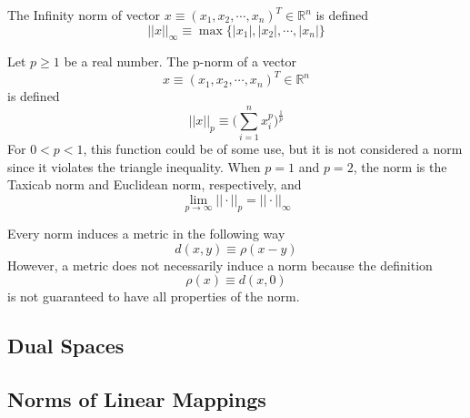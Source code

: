   \begin{example}
    The Infinity norm of vector $x \equiv (x_1, x_2, \cdots, x_n)^T \in \mathbb{R}^n$ is defined
    \begin{equation}
      ||x||_\infty \equiv \max{\{|x_1|, |x_2|, \cdots, |x_n|\}}
    \end{equation}
  \end{example}

  \begin{example}
    Let $p\geq 1$ be a real number. The p-norm of a vector 
    \begin{equation}
      x \equiv (x_1, x_2, \cdots, x_n)^T \in \mathbb{R}^n
    \end{equation}
    is defined
    \begin{equation}
      ||x||_p \equiv \bigg( \sum_{i=1}^n x_i^p \bigg)^{\frac{1}{p}}
    \end{equation}
    For $0<p<1$, this function could be of some use, but it is not considered a norm since it violates the triangle inequality. When $p = 1$ and $p =2$, the norm is the Taxicab norm and Euclidean norm, respectively, and 
    \begin{equation}
      \lim_{p \rightarrow \infty} ||\cdot||_p = ||\cdot||_\infty
    \end{equation}
  \end{example}

  \begin{theorem}
    Every norm induces a metric in the following way
    \begin{equation}
      d(x, y) \equiv \rho(x-y)
    \end{equation}
    However, a metric does not necessarily induce a norm because the definition
    \begin{equation}
      \rho(x) \equiv d(x, 0)
    \end{equation}
    is not guaranteed to have all properties of the norm. 
  \end{theorem}

\subsection{Dual Spaces}

\subsection{Norms of Linear Mappings}

